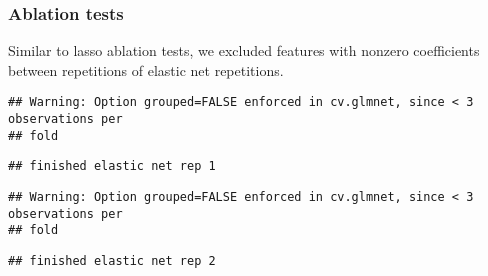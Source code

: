 \documentclass[]{article}
\newenvironment{Shaded}{\begin{snugshade}}{\end{snugshade}}
\newcommand{\ControlFlowTok}[1]{\textcolor[rgb]{0.13,0.29,0.53}{\textbf{#1}}}
\newcommand{\DataTypeTok}[1]{\textcolor[rgb]{0.13,0.29,0.53}{#1}}
\newcommand{\DecValTok}[1]{\textcolor[rgb]{0.00,0.00,0.81}{#1}}
\newcommand{\KeywordTok}[1]{\textcolor[rgb]{0.13,0.29,0.53}{\textbf{#1}}}
\newcommand{\NormalTok}[1]{#1}
\newcommand{\OperatorTok}[1]{\textcolor[rgb]{0.81,0.36,0.00}{\textbf{#1}}}
\newcommand{\StringTok}[1]{\textcolor[rgb]{0.31,0.60,0.02}{#1}}
\begin{document}
\hypertarget{ablation-tests-3}{%
\subsubsection{Ablation tests}\label{ablation-tests-3}}

Similar to lasso ablation tests, we excluded features with nonzero
coefficients between repetitions of elastic net repetitions.

\begin{Shaded}
\end{Shaded}

\begin{verbatim}
## Warning: Option grouped=FALSE enforced in cv.glmnet, since < 3 observations per
## fold
\end{verbatim}

\begin{verbatim}
## finished elastic net rep 1
\end{verbatim}

\begin{verbatim}
## Warning: Option grouped=FALSE enforced in cv.glmnet, since < 3 observations per
## fold
\end{verbatim}

\begin{verbatim}
## finished elastic net rep 2
\end{verbatim}
\end{document}

